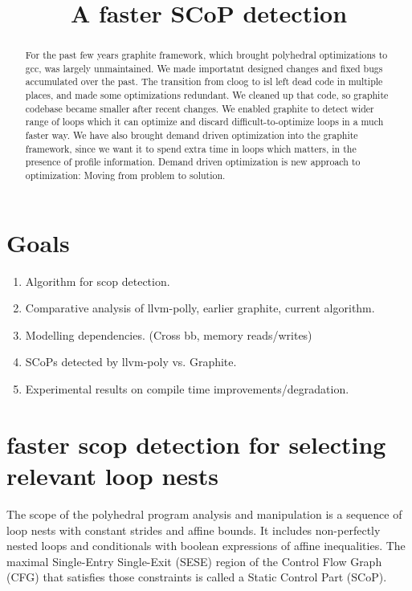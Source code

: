 \documentclass{sigplanconf}
\begin{document}
\setlength{\pdfpageheight}{\paperheight}
\setlength{\pdfpagewidth}{\paperwidth}


\title{A faster SCoP detection}

\maketitle

\begin{abstract}
  For the past few years graphite framework, which brought polyhedral optimizations
  to gcc, was largely unmaintained. We made importatnt designed changes and fixed bugs accumulated over
  the past. The transition from cloog to isl left dead code in multiple places, and made some optimizations
  redundant. We cleaned up that code, so graphite codebase became smaller after recent changes.
  We enabled graphite to detect wider range of loops which it can optimize and discard
  difficult-to-optimize loops in a much faster way. We have also brought demand driven optimization
  into the graphite framework, since we want it to spend extra time in loops which matters,
  in the presence of profile information.
  Demand driven optimization is new approach to optimization: Moving from problem to solution.
\end{abstract}

\section{Goals}
\begin{enumerate}

  \item Algorithm for scop detection.
  \item Comparative analysis of llvm-polly, earlier graphite, current algorithm.
  \item Modelling dependencies. (Cross bb, memory reads/writes)
  \item SCoPs detected by llvm-poly vs. Graphite.
  \item Experimental results on compile time improvements/degradation.

\end{enumerate}


\section{faster scop detection for selecting relevant loop nests}
The scope of the polyhedral program analysis and manipulation is a sequence of loop
nests with constant strides and affine bounds. It includes non-perfectly nested loops
and conditionals with boolean expressions of affine inequalities.
The maximal Single-Entry Single-Exit (SESE) region of the Control Flow Graph
(CFG) that satisfies those constraints is called a Static Control Part (SCoP). \cite{Girbal, Bondhugula, trifunovic}
\end{document}
